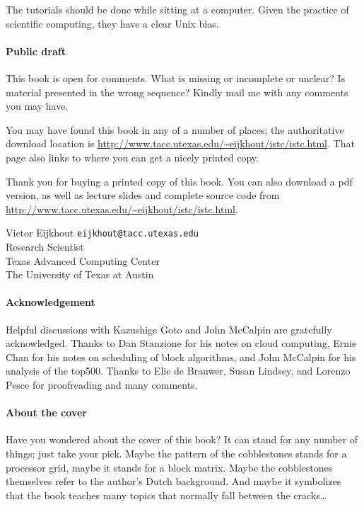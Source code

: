 The tutorials
should be done while sitting at a computer. Given the practice of
scientific computing, they have a clear Unix bias.

\begin{notlulu}
\paragraph*{\bf Public draft}

This book is 
open for comments.
What is missing or incomplete or unclear? Is material
presented in the wrong sequence? Kindly mail me with any comments you
may have.
\end{notlulu}

\begin{download}
You may have found this book in any of a number of places; the
authoritative download location is 
\url{http://www.tacc.utexas.edu/~eijkhout/istc/istc.html}.
That page also links to  where you can get a nicely printed copy.
\end{download}
\begin{lulu}
Thank you for buying a printed copy of this book. 
You can also download a pdf 
version, as well as lecture slides and complete source code from
\url{http://www.tacc.utexas.edu/~eijkhout/istc/istc.html}.
\end{lulu}

\bigskip
\noindent
Victor Eijkhout {\tt eijkhout@tacc.utexas.edu}\\
Research Scientist\\
Texas Advanced Computing Center\\
The University of Texas at Austin

\paragraph*{\bf Acknowledgement}

Helpful discussions with Kazushige Goto and John McCalpin are gratefully
acknowledged. Thanks to Dan Stanzione for his notes on cloud computing,
Ernie Chan for his notes on scheduling of block algorithms, and John
McCalpin for his analysis of the top500.
Thanks to Elie de Brauwer, Susan Lindsey, and Lorenzo Pesce
for proofreading and many comments.

\begin{lulu}
\paragraph*{\bf About the cover}

Have you wondered about the cover of this book? It can stand for any number of things; just take your pick. Maybe the pattern of the cobblestones stands for a processor grid, maybe it stands for a block matrix. Maybe the cobblestones themselves refer to the author's Dutch background. And maybe it symbolizes that the book teaches many topics that normally fall between the cracks\ldots
\end{lulu}

